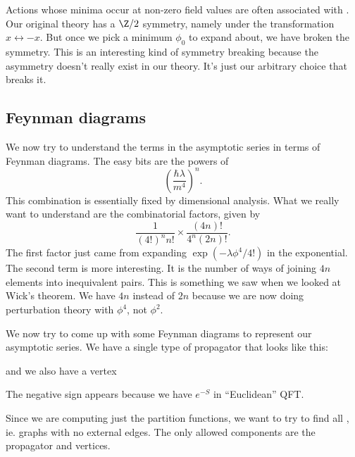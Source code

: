 \documentclass[a4paper]{article}
\begin{document}
Actions whose minima occur at non-zero field values are often associated with . Our original theory has a $\Z/2$ symmetry, namely under the transformation $x \leftrightarrow -x$. But once we pick a minimum $\phi_0$ to expand about, we have broken the symmetry. This is an interesting kind of symmetry breaking because the asymmetry doesn't really exist in our theory. It's just our arbitrary choice that breaks it.

\subsection{Feynman diagrams}
We now try to understand the terms in the asymptotic series in terms of Feynman diagrams. The easy bits are the powers of
\[
  \left(\frac{\hbar \lambda}{m^4}\right)^n.
\]
This combination is essentially fixed by dimensional analysis. What we really want to understand are the combinatorial factors, given by
\[
  \frac{1}{(4!)^n n!} \times \frac{(4n)!}{4^n (2n)!}.
\]
The first factor just came from expanding $\exp(-\lambda \phi^4/4!)$ in the exponential. The second term is more interesting. It is the number of ways of joining $4n$ elements into inequivalent pairs. This is something we saw when we looked at Wick's theorem. We have $4n$ instead of $2n$ because we are now doing perturbation theory with $\phi^4$, not $\phi^2$.

We now try to come up with some Feynman diagrams to represent our asymptotic series. We have a single type of propagator that looks like this:
\begin{center}
\end{center}
and we also have a vertex
\begin{center}
\end{center}
The negative sign appears because we have $e^{-S}$ in ``Euclidean'' QFT.

Since we are computing just the partition functions, we want to try to find all , ie. graphs with no external edges. The only allowed components are the propagator and vertices.
\end{document}
